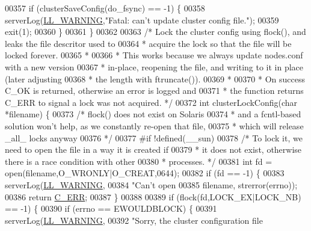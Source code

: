 \begin{DoxyCode}
{{{{00357     \textcolor{keywordflow}{if} (clusterSaveConfig(do\_fsync) == -1) \{
00358         serverLog(\hyperlink{server_8h_a31229b9334bba7d6be2a72970967a14b}{LL\_WARNING},\textcolor{stringliteral}{"Fatal: can't update cluster config file."});
00359         exit(1);
00360     \}
00361 \}
00362 
00363 \textcolor{comment}{/* Lock the cluster config using flock(), and leaks the file descritor used to}
00364 \textcolor{comment}{ * acquire the lock so that the file will be locked forever.}
00365 \textcolor{comment}{ *}
00366 \textcolor{comment}{ * This works because we always update nodes.conf with a new version}
00367 \textcolor{comment}{ * in-place, reopening the file, and writing to it in place (later adjusting}
00368 \textcolor{comment}{ * the length with ftruncate()).}
00369 \textcolor{comment}{ *}
00370 \textcolor{comment}{ * On success C\_OK is returned, otherwise an error is logged and}
00371 \textcolor{comment}{ * the function returns C\_ERR to signal a lock was not acquired. */}
00372 \textcolor{keywordtype}{int} clusterLockConfig(\textcolor{keywordtype}{char} *filename) \{
00373 \textcolor{comment}{/* flock() does not exist on Solaris}
00374 \textcolor{comment}{ * and a fcntl-based solution won't help, as we constantly re-open that file,}
00375 \textcolor{comment}{ * which will release \_all\_ locks anyway}
00376 \textcolor{comment}{ */}
00377 \textcolor{preprocessor}{#}\textcolor{preprocessor}{if} \textcolor{preprocessor}{!}\textcolor{preprocessor}{defined}\textcolor{preprocessor}{(}\textcolor{preprocessor}{\_\_sun}\textcolor{preprocessor}{)}
00378     \textcolor{comment}{/* To lock it, we need to open the file in a way it is created if}
00379 \textcolor{comment}{     * it does not exist, otherwise there is a race condition with other}
00380 \textcolor{comment}{     * processes. */}
00381     \textcolor{keywordtype}{int} fd = open(filename,O\_WRONLY|O\_CREAT,0644);
00382     \textcolor{keywordflow}{if} (fd == -1) \{
00383         serverLog(\hyperlink{server_8h_a31229b9334bba7d6be2a72970967a14b}{LL\_WARNING},
00384             \textcolor{stringliteral}{"Can't open %
00385             filename, strerror(errno));
00386         \textcolor{keywordflow}{return} \hyperlink{server_8h_af98ac28d5f4d23d7ed5985188e6fb7d1}{C\_ERR};
00387     \}
00388 
00389     \textcolor{keywordflow}{if} (flock(fd,LOCK\_EX|LOCK\_NB) == -1) \{
00390         \textcolor{keywordflow}{if} (errno == EWOULDBLOCK) \{
00391             serverLog(\hyperlink{server_8h_a31229b9334bba7d6be2a72970967a14b}{LL\_WARNING},
00392                  \textcolor{stringliteral}{"Sorry, the cluster configuration file %
}}}}}}
\end{DoxyCode}
